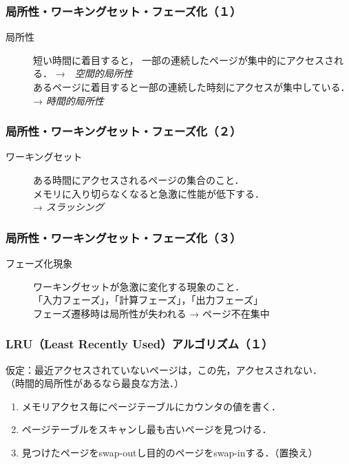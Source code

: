 \documentclass[unicode,handout]{beamer}                   %
\begin{document}
\begin{frame}
  \frametitle{局所性・ワーキングセット・フェーズ化（１）}
  \begin{description}
  \item[局所性]
    短い時間に着目すると，
    一部の連続したページが集中的にアクセスされる．
    →　\emph{空間的局所性}\\
    あるページに着目すると一部の連続した時刻にアクセスが集中している．
    → \emph{時間的局所性}
  \end{description}
\end{frame}

\begin{frame}
  \frametitle{局所性・ワーキングセット・フェーズ化（２）}
  \begin{description}
  \item[ワーキングセット]
    ある時間にアクセスされるページの集合のこと．\\
    メモリに入り切らなくなると急激に性能が低下する．\\
    → \emph{スラッシング}
  \end{description}
\end{frame}

\begin{frame}
  \frametitle{局所性・ワーキングセット・フェーズ化（３）}
  \begin{description}
  \item[フェーズ化現象]
    ワーキングセットが急激に変化する現象のこと．\\
    「入力フェーズ」，「計算フェーズ」，「出力フェーズ」 \\
    フェーズ遷移時は局所性が失われる → ページ不在集中
\end{description}
\end{frame}

\begin{frame}
  \frametitle{LRU（Least Recently Used）アルゴリズム（１）}
  仮定：最近アクセスされていないページは，この先，アクセスされない．\\
  （時間的局所性があるなら最良な方法．）
  \vspace{3mm}
  \begin{enumerate}
  \item[1.] メモリアクセス毎にページテーブルにカウンタの値を書く．
  \item[2.] ページテーブルをスキャンし最も古いページを見つける．
  \item[3.] 見つけたページをswap-outし目的のページをswap-inする．（置換え）
  \end{enumerate}
\end{frame}
\end{document}
